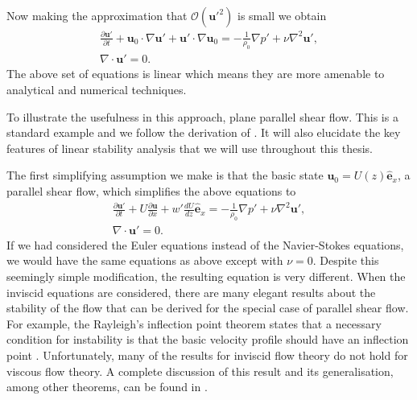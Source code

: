 
Now making the approximation that $\mathcal{O}(\bm{u}'^{2})$ is small we obtain
\begin{align}
\frac{\partial \bm{u}'}{\partial t} + \bm{u}_{0}\cdot\nabla \bm{u}' + \bm{u}'\cdot\nabla\bm{u}_{0} =  -\frac{1}{\rho_{0}}\nabla p' + \nu\nabla^{2}\bm{u}',\\
 \nabla \cdot \bm{u}'=0.
\end{align}
The above set of equations is linear which means they are more amenable to analytical and numerical techniques. 

To illustrate the usefulness in this approach,  plane parallel shear flow. This is a standard example and we follow the derivation of \cite{drazinreid}. It will also elucidate the key features of linear stability analysis that we will use throughout this thesis.

The first simplifying assumption we make is that the basic state $\bm{u}_{0}=U(z)\hat{\bm{e}}_{x}$, a parallel shear flow, which simplifies the above equations to
\begin{align}
\frac{\partial \bm{u}'}{\partial t} + U\frac{\partial \bm{u}}{\partial x} + w'\frac{dU}{dz}\hat{\bm{e}}_{x}= -\frac{1}{\rho_{0}}\nabla p' + \nu\nabla^{2} \bm{u}',\\
\nabla \cdot\bm{u}'=0.
\end{align}
If we had considered the Euler equations instead of the Navier-Stokes equations, we would have the same equations as above except with $\nu=0$. Despite this seemingly simple modification, the resulting equation is very different. When the inviscid equations are considered, there are many elegant results about the stability of the flow that can be derived for the special case of parallel shear flow. For example, the Rayleigh's inflection point theorem states that a necessary condition for instability is that the basic velocity profile should have an inflection point \cite{drazinreid}. Unfortunately, many of the results for inviscid flow theory do not hold for viscous flow theory. A complete discussion of this result and its generalisation, among other theorems, can be found in \cite{drazinreid,kundu}.

